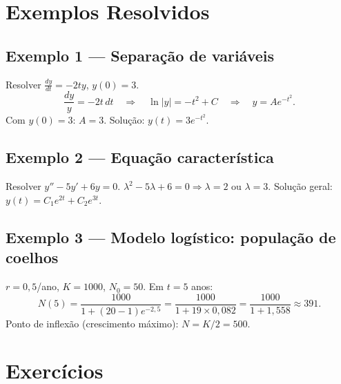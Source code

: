 \documentclass[12pt,a4paper]{article}
\begin{document}
\section*{Exemplos Resolvidos}

\subsection*{Exemplo 1 --- Separa\c{c}\~ao de vari\'aveis}
Resolver $\frac{dy}{dt} = -2ty$, $y(0)=3$.
\[
\frac{dy}{y} = -2t\,dt \quad\Rightarrow\quad \ln|y| = -t^2 + C \quad\Rightarrow\quad y = Ae^{-t^2}.
\]
Com $y(0)=3$: $A=3$. Solu\c{c}\~ao: $y(t) = 3e^{-t^2}$.

\subsection*{Exemplo 2 --- Equa\c{c}\~ao caracter\'istica}
Resolver $y'' - 5y' + 6y = 0$.
$\lambda^2 - 5\lambda + 6 = 0 \Rightarrow \lambda = 2$ ou $\lambda = 3$.
Solu\c{c}\~ao geral: $y(t) = C_1 e^{2t} + C_2 e^{3t}$.

\subsection*{Exemplo 3 --- Modelo log\'istico: popula\c{c}\~ao de coelhos}
$r=0{,}5$/ano, $K=1000$, $N_0=50$. Em $t=5$ anos:
\[
N(5) = \frac{1000}{1 + (20-1)e^{-2{,}5}} = \frac{1000}{1 + 19\times0{,}082} = \frac{1000}{1+1{,}558} \approx 391.
\]
Ponto de inflex\~ao (crescimento m\'aximo): $N = K/2 = 500$.

\section*{Exerc\'icios}
\end{document}
